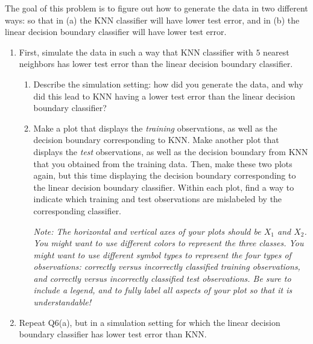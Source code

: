 \documentclass[12pt]{article}
\begin{document}
\begin{enumerate}
The goal of this problem is to figure out how to  generate the data in two different ways: so that in (a) the KNN classifier will have lower test error, and in (b) the linear decision boundary classifier will have lower test error.
 \begin{enumerate}
\item First, simulate the data in such a way that KNN classifier with $5$ nearest neighbors has lower test error than the linear decision boundary  classifier. 
\begin{enumerate}
    \item Describe the simulation setting: how did you generate the data, and why did this lead to KNN having a lower test error than the linear decision boundary classifier?
\item Make a plot that displays the \textit{training} observations, as well as the decision boundary corresponding to KNN. Make another plot that displays the \textit{test} observations, as well as the decision boundary from KNN that you obtained from the training data. Then, make these two plots again, but this time displaying the decision boundary corresponding to the linear decision boundary classifier. Within each plot, find a way to indicate which training and test observations are mislabeled by the corresponding classifier.

\emph{Note: The horizontal and vertical axes of your plots should be $X_1$ and $X_2$. You might want to  use different colors to represent the three classes. You might want to use different symbol types to represent the four types of observations: correctly versus incorrectly classified training observations, and correctly versus incorrectly classified test observations. Be sure to include a legend, and to fully label all aspects of your plot so that it is understandable!}
\end{enumerate}
\item Repeat Q6(a), but in a simulation setting for which the linear decision boundary classifier has lower test error than KNN. 
\end{enumerate}
\end{enumerate}
\end{document}
